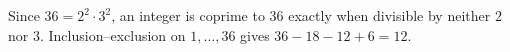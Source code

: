 Since $36=2^2\cdot3^2$, an integer is coprime to $36$ exactly when divisible by neither $2$ nor $3$. Inclusion--exclusion on $1,\ldots,36$ gives $36-18-12+6=\boxed{12}$.

